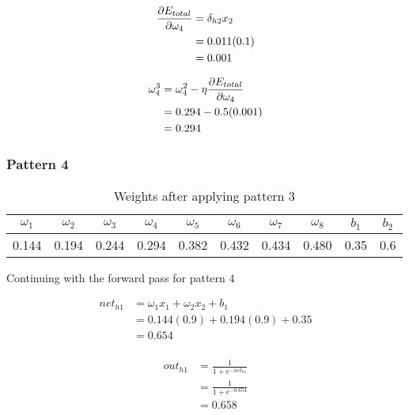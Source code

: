 \documentclass[10pt,a4paper]{article}
\begin{document}
\begin{equation}
\begin{split}
\pdv{E_{total}}{\omega_4} &= \delta_{h2}x_2\\ 
                          &= 0.011(0.1)\\
                          &= 0.001\\
\end{split}
\end{equation}

\begin{equation}
\begin{split}
\omega_4^3 &= \omega_4^2 - \eta\pdv{E_{total}}{\omega_4}\\
           &= 0.294 -0.5(0.001)\\
           &= 0.294\\
\end{split}
\end{equation}

\subsubsection{Pattern 4}
\begin{table}
\begin{tabular}{|c|c|c|c|c|c|c|c|c|c|}
\hline
$\omega_1$ & $\omega_2$ & $\omega_3$ & $\omega_4$ & $\omega_5$ & $\omega_6$ & $\omega_7$ & $\omega_8$ & $b_1$ & $b_2$\\
\hline
0.144 &0.194 &0.244 & 0.294 & 0.382 & 0.432 & 0.434 & 0.480 & 0.35 & 0.6 \\
\hline
\end{tabular}
\caption{Weights after applying pattern 3}\label{tablep4}
\end{table}

Continuing with the forward pass for pattern 4

\begin{equation}
\begin{split}
net_{h1} &= \omega_1 x_1 + \omega_2 x_2 + b_1 \\
         &= 0.144(0.9) + 0.194(0.9) + 0.35 \\
         &= 0.654\\
\end{split}
\end{equation}

\begin{equation}
\begin{split}
out_{h1} &= \frac{1}{1+e^{-net_{h1}}}\\ 
         &= \frac{1}{1+e^{-0.654}}\\ 
         &= 0.658\\
\end{split}
\end{equation}
\end{document}
